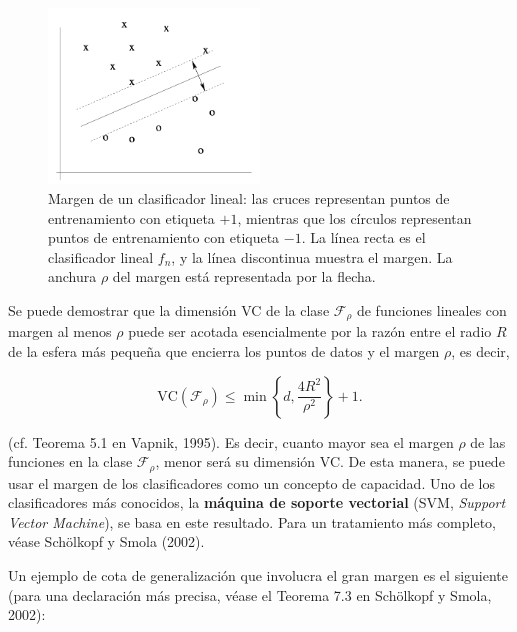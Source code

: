 \documentclass{report}
\begin{document}
\begin{figure}[ht!]
    \centering
    \includegraphics[width=0.5\textwidth]{Images/6.png}
    \caption{Margen de un clasificador lineal: las cruces representan puntos de entrenamiento con 
    etiqueta \(+1\), mientras que los círculos representan puntos de entrenamiento con etiqueta \(-1\). 
    La línea recta es el clasificador lineal \(f_n\), y la línea discontinua muestra el margen. La 
    anchura \(\rho\) del margen está representada por la flecha.}
    \label{fig:Clasificación con margen}
\end{figure}

Se puede demostrar que la dimensión VC de la clase \(\mathcal{F}_\rho\) de funciones lineales con 
margen al menos \(\rho\) puede ser acotada esencialmente por la razón entre el radio \(R\) de la 
esfera más pequeña que encierra los puntos de datos y el margen \(\rho\), es decir,

\[
\text{VC}(\mathcal{F}_\rho) \leq \min \left\{d, \frac{4R^2}{\rho^2} \right\} +1.
\]

(cf. Teorema 5.1 en Vapnik, 1995). Es decir, cuanto mayor sea el margen \(\rho\) de las funciones 
en la clase \(\mathcal{F}_\rho\), menor será su dimensión VC. De esta manera, se puede usar el 
margen de los clasificadores como un concepto de capacidad. Uno de los clasificadores más conocidos, 
la \textbf{máquina de soporte vectorial} (SVM, \textit{Support Vector Machine}), se basa en este 
resultado. Para un tratamiento más completo, véase Schölkopf y Smola (2002).\newline

Un ejemplo de cota de generalización que involucra el gran margen es el siguiente (para una 
declaración más precisa, véase el Teorema 7.3 en Schölkopf y Smola, 2002):\newline
\end{document}
